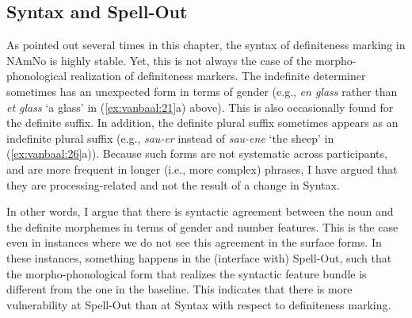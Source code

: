 \documentclass[output=paper]{langscibook}
\begin{document}
\subsection{Syntax and Spell-Out} 
\largerpage

As pointed out several times in this chapter, the syntax of definiteness marking in NAmNo is highly stable. Yet, this is not always the case of the morpho-phonological realization of definiteness markers. The indefinite determiner sometimes has an unexpected form in terms of gender (e.g., \textit{en glass} rather than \textit{et glass} `a glass' in (\ref{ex:vanbaal:21}a) above). This is also occasionally found for the definite suffix. In addition, the definite plural suffix sometimes appears as an indefinite plural suffix (e.g., \textit{sau-er} instead of \textit{sau-ene} `the sheep' in (\ref{ex:vanbaal:26}a)). Because such forms are not systematic across participants, and are more frequent in longer (i.e., more complex) phrases, I have argued that they are processing-related and not the result of a change in Syntax.
 
In other words, I argue that there is syntactic agreement between the noun and the definite morphemes in terms of gender and number features. This is the case even in instances where we do not see this agreement in the surface forms. In these instances, something happens in the (interface with) Spell-Out, such that the morpho-phonological form that realizes the syntactic feature bundle is different from the one in the baseline. This indicates that there is more vulnerability at Spell-Out than at Syntax with respect to definiteness marking.
 
\end{document}
